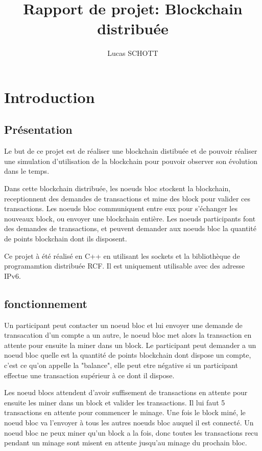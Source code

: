 \documentclass[a4paper,11pt,DIV=12]{scrreprt}
\title{Rapport de projet: Blockchain distribuée}
\author{Lucas SCHOTT}
\begin{document}

    \maketitle

    \chapter{Introduction}

    \section{Présentation}

    Le but de ce projet est de réaliser une blockchain distibuée et de pouvoir
    réaliser une simulation d'utilisation de la blockchain pour pouvoir observer
    son évolution dans le temps.

    Dans cette blockchain distribuée, les noeuds bloc stockent la blockchain,
    receptionnent des demandes de transactions et mine des block pour valider
    ces transactions. Les noeuds bloc communiquent entre eux pour s'échanger les
    nouveaux block, ou envoyer une blockchain entière.
    Les noeuds participants font des demandes de transactions, et peuvent
    demander aux noeuds bloc la quantité de points blockchain dont ils disposent.

    Ce projet à été réalisé en C++ en utilisant les sockets et la bibliothèque
    de programamtion distribuée RCF. Il est uniquement utilisable avec des adresse IPv6.

    \section{fonctionnement}

    Un participant peut contacter un noeud bloc et lui envoyer une demande de
    transacation d'un compte a un autre, le noeud bloc met alors la transaction
    en attente pour ensuite la miner dans un block. Le participant peut demander a un noeud bloc quelle est la
    quantité de points blockchain dont dispose un compte, c'est ce qu'on
    appelle la "balance", elle peut etre négative si un participant effectue une
    transaction supérieur à ce dont il dispose.

    Les noeud blocs attendent d'avoir suffisement de transactions en attente
    pour ensuite les miner dans un block et valider les transactions. Il lui faut 5
    transactions en attente pour commencer le minage. Une fois le block
    miné, le noeud bloc va l'envoyer à tous les autres noeuds bloc auquel il
    est connecté. Un noeud bloc ne peux miner qu'un block a la fois, donc toutes
    les transactions recu pendant un minage sont misent en attente jusqu'au
    minage du prochain bloc.
    \\
\end{document}
